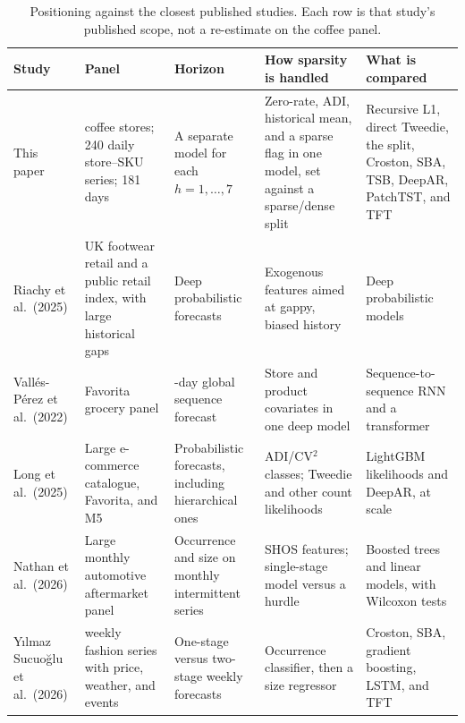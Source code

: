 \documentclass[review,authoryear]{elsarticle}
\begin{document}
\begin{table}[H]
    \centering
    \caption{Positioning against the closest published studies. Each row is that study's published scope, not a re-estimate on the coffee panel.}
    \label{tab:positioning}
    \footnotesize
    \setlength{\tabcolsep}{3pt}
    \begin{tabular}{@{}>{\raggedright\arraybackslash}p{}>{\raggedright\arraybackslash}p{}>{\raggedright\arraybackslash}p{}>{\raggedright\arraybackslash}p{}>{\raggedright\arraybackslash}p{}@{}}
        \toprule
        Study & Panel & Horizon & How sparsity is handled & What is compared \\
        \midrule
        This paper &
        3 coffee stores; 240 daily store--SKU series; 181 days &
        A separate model for each $h=1,\ldots,7$ &
        Zero-rate, ADI, historical mean, and a sparse flag in one model, set against a sparse/dense split &
        Recursive L1, direct Tweedie, the split, Croston, SBA, TSB, DeepAR, PatchTST, and TFT \\
        \addlinespace
        Riachy et al.\ (2025) &
        UK footwear retail and a public retail index, with large historical gaps &
        Deep probabilistic forecasts &
        Exogenous features aimed at gappy, biased history &
        Deep probabilistic models \\
        \addlinespace
        Vall\'es-P\'erez et al.\ (2022) &
        Favorita grocery panel &
        16-day global sequence forecast &
        Store and product covariates in one deep model &
        Sequence-to-sequence RNN and a transformer \\
        \addlinespace
        Long et al.\ (2025) &
        Large e-commerce catalogue, Favorita, and M5 &
        Probabilistic forecasts, including hierarchical ones &
        ADI/CV$^{2}$ classes; Tweedie and other count likelihoods &
        LightGBM likelihoods and DeepAR, at scale \\
        \addlinespace
        Nathan et al.\ (2026) &
        Large monthly automotive aftermarket panel &
        Occurrence and size on monthly intermittent series &
        SHOS features; single-stage model versus a hurdle &
        Boosted trees and linear models, with Wilcoxon tests \\
        \addlinespace
        Y{\i}lmaz Sucuo{\u{g}}lu et al.\ (2026) &
        64 weekly fashion series with price, weather, and events &
        One-stage versus two-stage weekly forecasts &
        Occurrence classifier, then a size regressor &
        Croston, SBA, gradient boosting, LSTM, and TFT \\
        \bottomrule
    \end{tabular}
\end{table}
\end{document}
